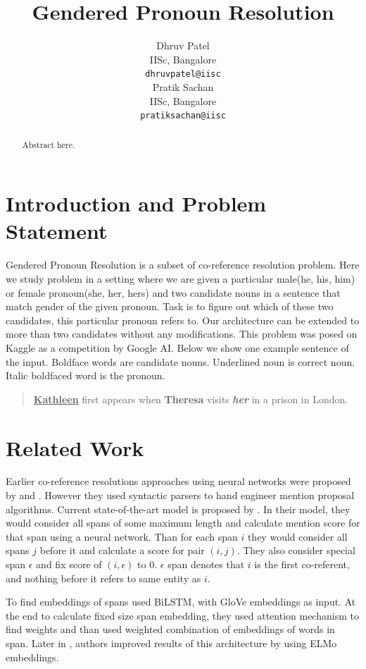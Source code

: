 \documentclass[11pt,a4paper]{article}
\title{Gendered Pronoun Resolution}
\author{Dhruv Patel \\
  IISc, Bangalore \\
  \texttt{dhruvpatel@iisc} \\\And
  Pratik Sachan \\
  IISc, Bangalore \\
  \texttt{pratiksachan@iisc} \\}
\date{}
\begin{document}

\maketitle
\begin{abstract}
  Abstract here.
\end{abstract}

\section{Introduction and Problem Statement}
Gendered Pronoun Resolution is a subset of co-reference resolution problem. Here we study problem in a setting where we are given a particular male(he, his, him) or female pronoun(she, her, hers) and two candidate nouns in a sentence that match gender of the given pronoun. Task is to figure out which of these two candidates, this particular pronoun refers to.  Our architecture can be extended to more than two candidates without any modifications. This problem was posed on Kaggle as a competition by Google AI. Below we show one example sentence of the input. Boldface words are candidate nouns. Underlined noun is correct noun. Italic boldfaced word is the pronoun.
\begin{quote}
   \textbf{\underline{Kathleen}} first appears when \textbf{Theresa} visits \textbf{\textit{her}} in a prison in London.
\end{quote}

\section{Related Work}
Earlier co-reference resolutions approaches using neural networks were proposed by \cite{wiseman2016learning} and \cite{clarkmanning2016deep}. However they used syntactic parsers to hand engineer mention proposal algorithms. Current state-of-the-art model is proposed by \cite{lee2017end}. In their model, they would consider all spans of some maximum length and calculate mention score for that span using a neural network. Than for each span $i$ they would consider all spans $j$ before it and calculate a score for pair $(i, j)$. They also consider special span $\epsilon$ and fix score of $(i, \epsilon)$ to 0. $\epsilon$ span denotes that $i$ is the first co-referent, and nothing before it refers to same entity as $i$.

To find embeddings of spans \cite{lee2017end} used BiLSTM, with GloVe \cite{pennington2014glove} embeddings as input. At the end to calculate fixed size span embedding, they used attention mechanism to find weights and than used weighted combination of embeddings of words in span. Later in \cite{Peters:2018}, authors improved results of this architecture by using ELMo embeddings.
\end{document}
